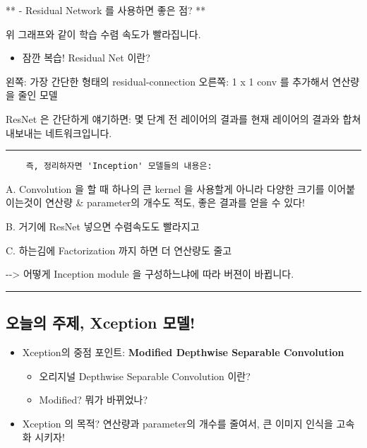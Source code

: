 \documentclass[11pt]{article}
\providecommand{\tightlist}{%
      \setlength{\itemsep}{0pt}\setlength{\parskip}{0pt}}
\begin{document}
** - Residual Network 를 사용하면 좋은 점? **

위 그래프와 같이 학습 수렴 속도가 빨라집니다.

\begin{itemize}
\tightlist
\item
  잠깐 복습! Residual Net 이란?
\end{itemize}

왼쪽: 가장 간단한 형태의 residual-connection \textbar{} 오른쪽: 1 x 1
conv 를 추가해서 연산량을 줄인 모델

ResNet 은 간단하게 얘기하면: 몇 단계 전 레이어의 결과를 현재 레이어의
결과와 합쳐 내보내는 네트워크입니다.

\begin{center}\rule{0.5\linewidth}{\linethickness}\end{center}

\begin{verbatim}
    즉, 정리하자면 'Inception' 모델들의 내용은: 
\end{verbatim}

A. Convolution 을 할 때 하나의 큰 kernel 을 사용할게 아니라 다양한
크기를 이어붙이는것이 연산량 \& parameter의 개수도 적도, 좋은 결과를
얻을 수 있다!

B. 거기에 ResNet 넣으면 수렴속도도 빨라지고

C. 하는김에 Factorization 까지 하면 더 연산량도 줄고

-\/-\textgreater{} 어떻게 Inception module 을 구성하느냐에 따라 버젼이
바뀝니다.

    \begin{center}\rule{0.5\linewidth}{\linethickness}\end{center}

\subsection{오늘의 주제, Xception
모델!}\label{uxc624uxb298uxc758-uxc8fcuxc81c-xception-uxbaa8uxb378}

\begin{itemize}
\tightlist
\item
  Xception의 중점 포인트: \textbf{Modified Depthwise Separable
  Convolution}

  \begin{itemize}
  \tightlist
  \item
    오리지널 Depthwise Separable Convolution 이란?
  \item
    Modified? 뭐가 바뀌었나?
  \end{itemize}
\item
  Xception 의 목적? 연산량과 parameter의 개수를 줄여서, 큰 이미지 인식을
  고속화 시키자!
\end{itemize}
\end{document}

